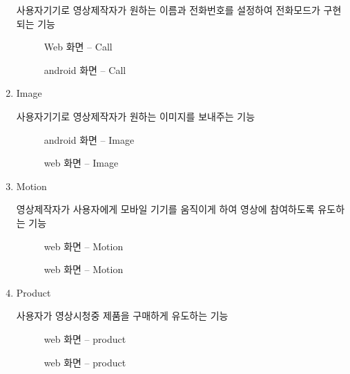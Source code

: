 \documentclass{oblivoir}
\begin{document}
\begin{enumerate}
    사용자기기로 영상제작자가 원하는 이름과 전화번호를 설정하여 전화모드가 구현되는 기능

    \begin{figure}[h!]
    \centering
    \caption{Web 화면 – Call}
    \end{figure}


    \begin{figure}[h!]
    \centering
    \caption{android 화면 – Call}
    \end{figure}


    \item  Image 

    사용자기기로 영상제작자가 원하는 이미지를 보내주는 기능

    \begin{figure}[h!]
    \centering
    \caption{android 화면 – Image}
    \end{figure}

    \begin{figure}[h!]
    \centering
    \caption{web 화면 – Image}
    \end{figure}



    \item Motion 

    영상제작자가 사용자에게 모바일 기기를 움직이게 하여 영상에 참여하도록 유도하는 기능
    \begin{figure}[h!]
    \centering
    \caption{web 화면 – Motion}
    \end{figure}
    \begin{figure}[h!]
    \centering
    \caption{web 화면 – Motion}
    \end{figure} 

    \item Product

    사용자가 영상시청중 제품을 구매하게 유도하는 기능 

    \begin{figure}[h!]
    \centering
    \caption{web 화면 – product}
    \end{figure} 

    \begin{figure}[h!]
    \centering
    \caption{web 화면 – product}
    \end{figure} 

\end{enumerate}
\end{document}

